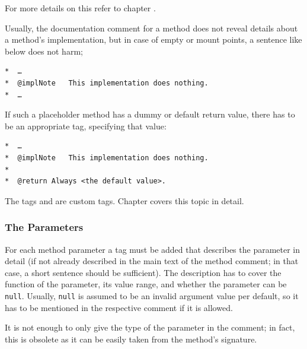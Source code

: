 For more details on this refer to chapter .

Usually, the documentation comment for a method does not reveal details about a method's implementation, but in case of empty  or mount points, a sentence like below does not harm;
\begin{lstlisting}[language=Comment]
*  …
*  @implNote   This implementation does nothing.
*  …
\end{lstlisting}

If such a placeholder method has a dummy or default return value, there has to be an appropriate  tag, specifying that value:
\begin{lstlisting}[language=Comment]
*  …
*  @implNote   This implementation does nothing.
*
*  @return Always <the default value>.
\end{lstlisting}

The tags  and  are custom tags. Chapter  covers this topic in detail.


\subsubsection{The Parameters}\label{sec:MethodParameterComments}
For each method parameter a  tag must be added that describes the parameter in detail (if not already described in the main text of the method comment; in that case, a short sentence should be sufficient). The description has to cover the function of the parameter, its value range, and whether the parameter can be \lstinline|null|. Usually, \lstinline|null| is assumed to be an invalid argument value per default, so it has to be mentioned in the respective comment if it is allowed.

It is not enough to only give the type of the parameter in the comment; in fact, this is obsolete as it can be easily taken from the method's signature.


